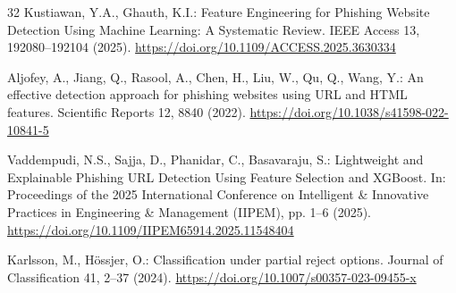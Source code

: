 \documentclass[conference]{IEEEtran}
\begin{document}
\begin{thebibliography}{32}
Kustiawan, Y.A., Ghauth, K.I.: Feature Engineering for Phishing Website Detection Using Machine Learning: A Systematic Review. IEEE Access 13, 192080--192104 (2025). \url{https://doi.org/10.1109/ACCESS.2025.3630334}

Aljofey, A., Jiang, Q., Rasool, A., Chen, H., Liu, W., Qu, Q., Wang, Y.: An effective detection approach for phishing websites using URL and HTML features. Scientific Reports 12, 8840 (2022). \url{https://doi.org/10.1038/s41598-022-10841-5}

Vaddempudi, N.S., Sajja, D., Phanidar, C., Basavaraju, S.: Lightweight and Explainable Phishing URL Detection Using Feature Selection and XGBoost. In: Proceedings of the 2025 International Conference on Intelligent \& Innovative Practices in Engineering \& Management (IIPEM), pp. 1--6 (2025). \url{https://doi.org/10.1109/IIPEM65914.2025.11548404}

Karlsson, M., H{\"o}ssjer, O.: Classification under partial reject options. Journal of Classification 41, 2--37 (2024). \url{https://doi.org/10.1007/s00357-023-09455-x}
\end{thebibliography}
\end{document}
